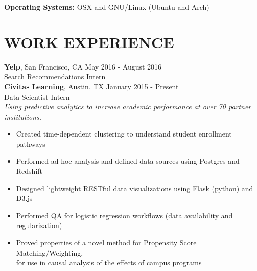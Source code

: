 \documentclass{resume}
\begin{document}
\textbf{Operating Systems:}
OSX and GNU/Linux (Ubuntu and Arch)

\section{WORK EXPERIENCE}
\textbf{Yelp}, San Francisco, CA \hfill{\small May 2016 - August 2016}\\
Search Recommendations Intern \\

\textbf{Civitas Learning}, Austin, TX \hfill{\small January 2015 - Present}\\
Data Scientist Intern \\
\emph{Using predictive analytics to increase academic performance at over 70 partner institutions.}
\begin{itemize}\itemsep-0.3em
\item Created time-dependent clustering to understand student enrollment pathways
\item Performed ad-hoc analysis and defined data sources using Postgres and Redshift
\item Designed lightweight RESTful data visualizations using Flask (python) and D3.js
\item Performed QA for logistic regression workflows (data availability and regularization)
\item Proved properties of a novel method for Propensity Score Matching/Weighting, \\
      \-\hspace{1em} for use in causal analysis of the effects of campus programs
\end{itemize}
\vspace{-4pt}                      %
\end{document}
